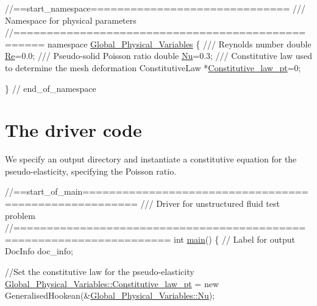 \begin{DoxyCodeInclude}
\textcolor{comment}{//==start\_namespace==============================}
\textcolor{comment}{/// Namespace for physical parameters}
\textcolor{comment}{}\textcolor{comment}{//==================================================}
\textcolor{keyword}{namespace }\hyperlink{namespaceGlobal__Physical__Variables}{Global\_Physical\_Variables}
\{
\textcolor{comment}{}
\textcolor{comment}{ /// Reynolds number}
\textcolor{comment}{} \textcolor{keywordtype}{double} \hyperlink{namespaceGlobal__Physical__Variables_ab814e627d2eb5bc50318879d19ab16b9}{Re}=0.0; 
\textcolor{comment}{}
\textcolor{comment}{ /// Pseudo-solid Poisson ratio}
\textcolor{comment}{} \textcolor{keywordtype}{double} \hyperlink{namespaceGlobal__Physical__Variables_a3962c36313826b19f216f6bbbdd6a477}{Nu}=0.3;
\textcolor{comment}{}
\textcolor{comment}{ /// Constitutive law used to determine the mesh deformation}
\textcolor{comment}{} ConstitutiveLaw *\hyperlink{namespaceGlobal__Physical__Variables_a2a37fb040c832ee7a086bb13bb02a100}{Constitutive\_law\_pt}=0;

\} \textcolor{comment}{// end\_of\_namespace}

\end{DoxyCodeInclude}




 

\hypertarget{index_main}{}\section{The driver code}\label{index_main}
We specify an output directory and instantiate a constitutive equation for the pseudo-\/elasticity, specifying the Poisson ratio.

 
\begin{DoxyCodeInclude}
\textcolor{comment}{//==start\_of\_main======================================================}
\textcolor{comment}{/// Driver for unstructured fluid test problem}
\textcolor{comment}{}\textcolor{comment}{//=====================================================================}
\textcolor{keywordtype}{int} \hyperlink{unstructured__two__d__fluid_8cc_ae66f6b31b5ad750f1fe042a706a4e3d4}{main}()
\{
 \textcolor{comment}{// Label for output}
 DocInfo doc\_info;
 
 \textcolor{comment}{//Set the constitutive law for the pseudo-elasticity}
 \hyperlink{namespaceGlobal__Physical__Variables_a2a37fb040c832ee7a086bb13bb02a100}{Global\_Physical\_Variables::Constitutive\_law\_pt} = 
  \textcolor{keyword}{new} GeneralisedHookean(&\hyperlink{namespaceGlobal__Physical__Variables_a3962c36313826b19f216f6bbbdd6a477}{Global\_Physical\_Variables::Nu});

\end{DoxyCodeInclude}


